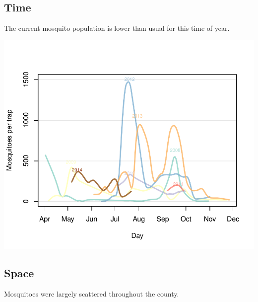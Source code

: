 \documentclass{article}
\begin{document}
\begin{multicols}{2} 



\subsection*{Time}
The current mosquito population is lower than usual for this time of year.
\begin{center}
\includegraphics{mosquitoReport-002}
\end{center}


\vfill
\columnbreak
\subsection*{Space}
Mosquitoes were largely scattered throughout the county.


\end{multicols}
\end{document}
